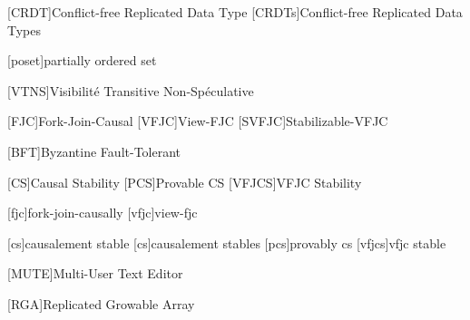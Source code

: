\usepackage{acronym} %

[CRDT]{Conflict-free Replicated Data Type}
[CRDTs]{Conflict-free Replicated Data Types}

[poset]{partially ordered set}

[VTNS]{Visibilité Transitive Non-Spéculative}

[FJC]{Fork-Join-Causal}
[VFJC]{View-\acl{FJC}}
[SVFJC]{Stabilizable-\acl{VFJC}}

[BFT]{Byzantine Fault-Tolerant}

[CS]{Causal Stability}
[PCS]{Provable \acl{CS}}
[VFJCS]{\acl{VFJC} Stability}

[fjc]{fork-join-causally}
[vfjc]{view-\acl{fjc}}

[cs]{causalement stable}
[cs]{causalement stables}
[pcs]{provably \acl{cs}}
[vfjcs]{\acl{vfjc} stable}

[MUTE]{Multi-User Text Editor}

[RGA]{Replicated Growable Array}

